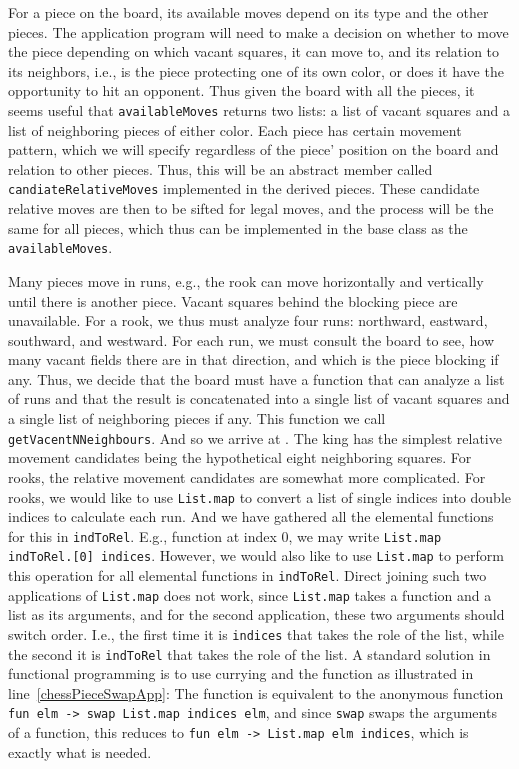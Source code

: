 For a piece on the board, its available moves depend on its type and the other pieces. The application program will need to make a decision on whether to move the piece depending on which vacant squares, it can move to, and its relation to its neighbors, i.e., is the piece protecting one of its own color, or does it have the opportunity to hit an opponent. Thus given the board with all the pieces, it seems useful that \lstinline{availableMoves} returns two lists: a list of vacant squares and a list of neighboring pieces of either color. Each piece has certain movement pattern, which we will specify regardless of the piece' position on the board and relation to other pieces. Thus, this will be an abstract member called \lstinline{candiateRelativeMoves} implemented in the derived pieces. These candidate relative moves are then to be sifted for legal moves, and the process will be the same for all pieces, which thus can be implemented in the base class as the \lstinline{availableMoves}.

Many pieces move in runs, e.g., the rook can move horizontally and vertically until there is another piece. Vacant squares behind the blocking piece are unavailable. For a rook, we thus must analyze four runs: northward, eastward, southward, and westward. For each run, we must consult the board to see, how many vacant fields there are in that direction, and which is the piece blocking if any. Thus, we decide that the board must have a function that can analyze a list of runs and that the result is concatenated into a single list of vacant squares and a single list of neighboring pieces if any. This function we call \lstinline{getVacentNNeighbours}. And so we arrive at .
%
%
The king has the simplest relative movement candidates being the hypothetical eight neighboring squares. For rooks, the relative movement candidates are somewhat more complicated. For rooks, we would like to use \lstinline{List.map} to convert a list of single indices into double indices to calculate each run. And we have gathered all the elemental functions for this in \lstinline{indToRel}. E.g., function at index 0, we may write \lstinline{List.map indToRel.[0] indices}. However, we would also like to use \lstinline{List.map} to perform this operation for all elemental functions in \lstinline{indToRel}. Direct joining such two applications of \lstinline{List.map} does not work, since \lstinline{List.map} takes a function and a list as its arguments, and for the second application, these two arguments should switch order.  I.e., the first time it is \lstinline{indices} that takes the role of the list, while the second it is \lstinline{indToRel} that takes the role of the list. A standard solution in functional programming is to use currying and the  function as illustrated in line~\ref{chessPieceSwapApp}: The function is equivalent to the anonymous function \lstinline{fun elm -> swap List.map indices elm}, and since \lstinline{swap} swaps the arguments of a function, this reduces to \lstinline{fun elm -> List.map elm indices}, which is exactly what is needed.

